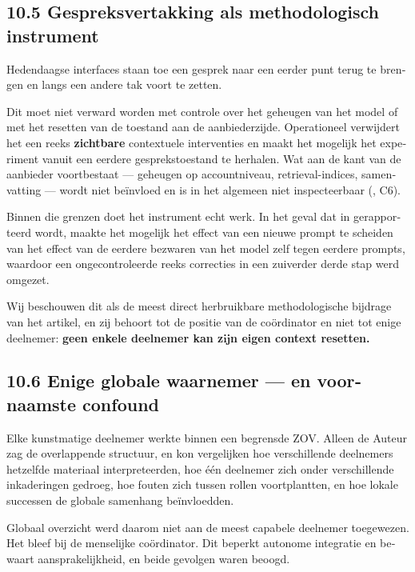 \begin{dutch}
\subsection*{10.5 Gespreksvertakking als methodologisch instrument}
\label{sec:nl:10.5}

Hedendaagse interfaces staan toe een gesprek naar een eerder punt terug te brengen en langs een andere tak voort te zetten.

Dit moet niet verward worden met controle over het geheugen van het model of met het resetten van de toestand aan de aanbiederzijde. Operationeel verwijdert het een reeks \textbf{zichtbare} contextuele interventies en maakt het mogelijk het experiment vanuit een eerdere gesprekstoestand te herhalen. Wat aan de kant van de aanbieder voortbestaat — geheugen op accountniveau, retrieval-indices, samenvatting — wordt niet beïnvloed en is in het algemeen niet inspecteerbaar (, C6).

Binnen die grenzen doet het instrument echt werk. In het geval dat in  gerapporteerd wordt, maakte het mogelijk het effect van een nieuwe prompt te scheiden van het effect van de eerdere bezwaren van het model zelf tegen eerdere prompts, waardoor een ongecontroleerde reeks correcties in een zuiverder derde stap werd omgezet.

Wij beschouwen dit als de meest direct herbruikbare methodologische bijdrage van het artikel, en zij behoort tot de positie van de coördinator en niet tot enige deelnemer: \textbf{geen enkele deelnemer kan zijn eigen context resetten.}


\subsection*{10.6 Enige globale waarnemer — en voornaamste confound}
\label{sec:nl:10.6}

Elke kunstmatige deelnemer werkte binnen een begrensde ZOV. Alleen de Auteur zag de overlappende structuur, en kon vergelijken hoe verschillende deelnemers hetzelfde materiaal interpreteerden, hoe één deelnemer zich onder verschillende inkaderingen gedroeg, hoe fouten zich tussen rollen voortplantten, en hoe lokale successen de globale samenhang beïnvloedden.

Globaal overzicht werd daarom niet aan de meest capabele deelnemer toegewezen. Het bleef bij de menselijke coördinator. Dit beperkt autonome integratie en bewaart aansprakelijkheid, en beide gevolgen waren beoogd.


\end{dutch}

